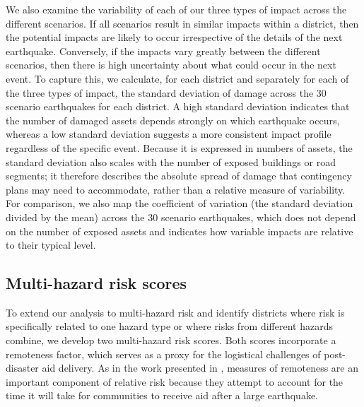 \documentclass[preprint,12pt,authoryear]{elsarticle}
\begin{document}
We also examine the variability of each of our three types of impact across the different scenarios. If all scenarios result in similar impacts within a district, then the potential impacts are likely to occur irrespective of the details of the next earthquake. Conversely, if the impacts vary greatly between the different scenarios, then there is high uncertainty about what could occur in the next event. To capture this, we calculate, for each district and separately for each of the three types of impact, the standard deviation of damage across the 30 scenario earthquakes for each district. A high standard deviation indicates that the number of damaged assets depends strongly on which earthquake occurs, whereas a low standard deviation suggests a more consistent impact profile regardless of the specific event. Because it is expressed in numbers of assets, the standard deviation also scales with the number of exposed buildings or road segments; it therefore describes the absolute spread of damage that contingency plans may need to accommodate, rather than a relative measure of variability. For comparison, we also map the coefficient of variation (the standard deviation divided by the mean) across the 30 scenario earthquakes, which does not depend on the number of exposed assets and indicates how variable impacts are relative to their typical level.

\subsection{Multi-hazard risk scores}

To extend our analysis to multi-hazard risk and identify districts where risk is specifically related to one hazard type or where risks from different hazards combine, we develop two multi-hazard risk scores. Both scores incorporate a remoteness factor, which serves as a proxy for the logistical challenges of post-disaster aid delivery. As in the work presented in \cite{Robinson2018}, measures of remoteness are an important component of relative risk because they attempt to account for the time it will take for communities to receive aid after a large earthquake.
\end{document}
